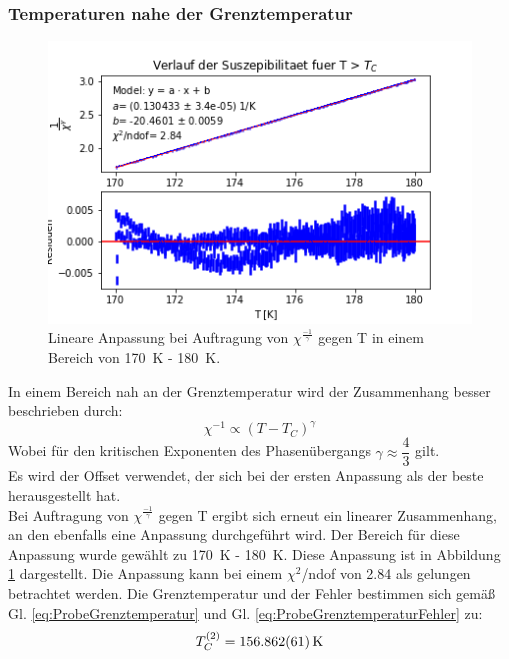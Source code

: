 \documentclass[12pt,a4paper]{article}
\begin{document}
\subsubsection{Temperaturen nahe der Grenztemperatur}

\begin{figure}
\centering
\includegraphics[scale=1]{Bilder/Haupt_Probe/CurieWeiss_gamma.png}
\caption[test]{Lineare Anpassung bei Auftragung von $\chi ^{\frac{-1}{\gamma}}$ gegen T in einem Bereich von \SI{170}{K} - \SI{180}{K}.}
\label{fig:CurieWeiss_gamma}
\end{figure}

In einem Bereich nah an der Grenztemperatur wird der Zusammenhang besser beschrieben durch:
\begin{equation*}
\chi ^{-1} \propto (T - T_C)^\gamma
\end{equation*}
Wobei für den kritischen Exponenten des Phasenübergangs $\gamma \approx \dfrac{4}{3}$ gilt. \\
Es wird der Offset verwendet, der sich bei der ersten Anpassung als der beste herausgestellt hat. \\
Bei Auftragung von $\chi ^{\frac{-1}{\gamma}}$ gegen T ergibt sich erneut ein linearer Zusammenhang, an den ebenfalls eine Anpassung durchgeführt wird. Der Bereich für diese Anpassung wurde gewählt zu \SI{170}{K} - \SI{180}{K}. Diese Anpassung ist in Abbildung \ref{fig:CurieWeiss_gamma} dargestellt. Die Anpassung kann bei einem $\chi ^2$/ndof von 2.84 als gelungen betrachtet werden. Die Grenztemperatur und der Fehler bestimmen sich gemäß Gl. \ref{eq:ProbeGrenztemperatur} und Gl. \ref{eq:ProbeGrenztemperaturFehler} zu:
\begin{equation*}
T_C^{(2)} = \SI{156,862 \pm 0,061}{K}
\end{equation*}
\end{document}
